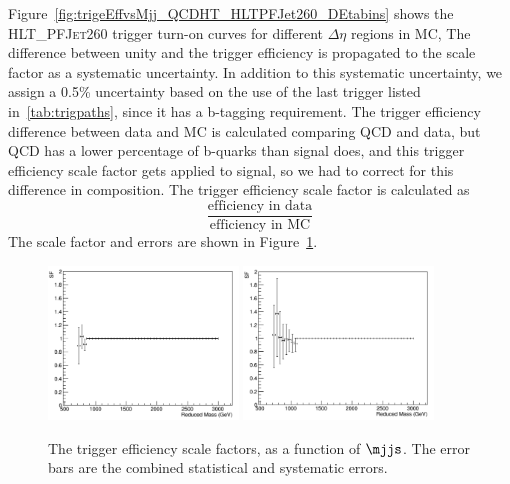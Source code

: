 Figure~\ref{fig:trigeEffvsMjj_QCDHT_HLTPFJet260_DEtabins} shows the \textsc{HLT\_PFJet260} trigger turn-on curves for different $\Delta\eta$ regions in MC, %
The difference between unity and the trigger efficiency is propagated to the scale factor as a systematic uncertainty. In addition to this systematic uncertainty, we assign a 0.5\% uncertainty based on the use of the last trigger listed in~\ref{tab:trigpaths}, since it has a b-tagging requirement. The trigger efficiency difference between data and MC is calculated comparing QCD and data, but QCD has a lower percentage of b-quarks than signal does, and this trigger efficiency scale factor gets applied to signal, so we had to correct for this difference in composition.
The trigger efficiency scale factor is calculated as
\begin{equation}
\frac{\text{efficiency in data}}{\text{efficiency in MC}}
\end{equation}
The scale factor and errors are shown in Figure~\ref{fig:trigSF}. 
\begin{figure}[h]
  \begin{center}  
    \includegraphics[width=0.45\textwidth]{F5/SFdEta0v2.pdf} 
    \includegraphics[width=0.45\textwidth]{F5/SFdEta1v2.pdf} 
  \end{center}
  \caption{The trigger efficiency scale factors, as a function of $\mjjs$. The error bars are the combined statistical and systematic errors.}
  \label{fig:trigSF}
  \end{figure} 

